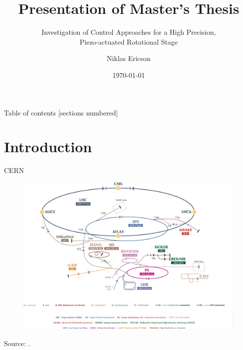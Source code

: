 \documentclass[10pt]{beamer}
\title{Presentation of Master's Thesis}
\subtitle{Investigation of Control Approaches for a High Precision, \\ Piezo-actuated Rotational Stage}
\date{\today}
\author{Niklas Ericson}
\institute{Linköping University | European Organization for Nuclear Research}
\begin{document}
\maketitle

\begin{frame}{Table of contents}
  [sections numbered]
  \tableofcontents[hideallsubsections]
\end{frame}

\section{Introduction}

\begin{frame}[fragile]{CERN}
  \begin{figure}[h!]
    \centering %
    \includegraphics[width=1\textwidth, trim= 0cm 7cm 0cm 0cm, clip=true]{../fig/lhc}
  \end{figure}
  Source: \cite{cern}.
\end{frame}
\end{document}

